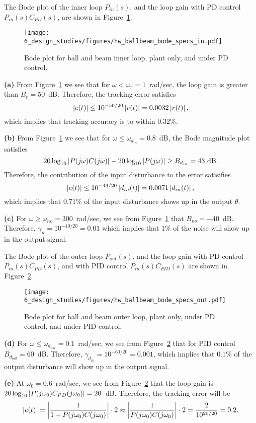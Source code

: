 The Bode plot of the inner loop $P_{in}(s)$, and the loop gain with PD control $P_{in}(s)C_{PD}(s)$, are shown in Figure~\ref{fig:hw_ballbeam_bode_specs_in}.
\begin{figure}[H]
   \centering
   \texttt{[image: 6\_design\_studies/figures/hw\_ballbeam\_bode\_specs\_in.pdf]}
   \caption{Bode plot for ball and beam inner loop, plant only, and under PD control.}
   \label{fig:hw_ballbeam_bode_specs_in}
\end{figure}


{\bf (a)} From Figure~\ref{fig:hw_ballbeam_bode_specs_in} we see that for $\omega<\omega_r=1$~rad/sec, the loop gain is greater than $B_r=50$~dB.  Therefore, the tracking error satisfies
\[
\left|e(t)\right|\leq 10^{-50/20}\left|r(t)\right| = 0.0032 \left|r(t)\right|,
\]
which implies that tracking accuracy is to within $0.32$\%.


{\bf (b)} From Figure~\ref{fig:hw_ballbeam_bode_specs_in} we see that for $\omega\leq\omega_{d_{in}}=0.8$~dB, the Bode magnitude plot satisfies 
\[
20\log_{10}\left|P(j\omega)C(j\omega)\right|-20\log_{10}\left|P(j\omega)\right| \geq B_{d_{in}}=43\text{~dB}.
\]  
Therefore, the contribution of the input disturbance to the error satisifies
\[
\left|e(t)\right| \leq 10^{-43/20}\left|d_{in}(t)\right| = 0.0071\left|d_{in}(t)\right|,
\]
which implies that $0.71$\% of the input disturbance shows up in the output $\theta$.

{\bf (c)} For $\omega\geq\omega_{no}=300$~rad/sec, we see from Figure~\ref{fig:hw_ballbeam_bode_specs_in} that $B_{no} = -40$~dB.  Therefore, $\gamma_n = 10^{-40/20} = 0.01$ which implies that $1$\% of the noise will show up in the output signal.


The Bode plot of the outer loop $P_{out}(s)$, and the loop gain with PD control $P_{in}(s)C_{PD}(s)$, and with  PID control $P_{in}(s)C_{PID}(s)$ are shown in Figure~\ref{fig:hw_ballbeam_bode_specs_out}.
\begin{figure}[H]
   \centering
   \texttt{[image: 6\_design\_studies/figures/hw\_ballbeam\_bode\_specs\_out.pdf]}
   \caption{Bode plot for ball and beam outer loop, plant only, under PD control, and under PID control.}
   \label{fig:hw_ballbeam_bode_specs_out}
\end{figure}


{\bf (d)} For $\omega\leq\omega_{d_{out}}=0.1$~rad/sec, we see from Figure~\ref{fig:hw_ballbeam_bode_specs_out} that for  PID control $B_{d_{out}} = 60$~dB.  Therefore, $\gamma_{d_{in}} = 10^{-60/20} = 0.001$, which implies that $0.1$\% of the output disturbance will show up in the output signal.


{\bf (e)} At $\omega_0=0.6$~rad/sec, we see from Figure~\ref{fig:hw_ballbeam_bode_specs_out} that the loop gain is $20\log_{10} \left|P(j\omega_0) C_{PD}(j\omega_0)\right| = 20$~dB.  Therefore, the tracking error will be
\[
\left|e(t)\right|=\left|\frac{1}{1+P(j\omega_0)C(j\omega_0)}\right|\cdot 2 \approx \left|\frac{1}{P(j\omega_0)C(j\omega_0)}\right|\cdot 2 = \frac{2}{10^{20/20}} = 0.2.
\]

